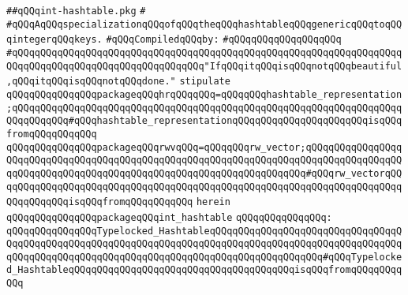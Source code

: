 \label{src/lib/src/int-hashtable.pkg}
\verb|##qQQqint-hashtable.pkg|\newline
\verb|#|\newline
\verb|#qQQqAqQQqspecializationqQQqofqQQqtheqQQqhashtableqQQqgenericqQQqtoqQQqintegerqQQqkeys.|\newline
\newline
\verb|#qQQqCompiledqQQqby:|\newline
\verb|#qQQqqQQqqQQqqQQqqQQq|\newline
\newline
\newline
\newline
\newline
\newline
\verb|#qQQqqQQqqQQqqQQqqQQqqQQqqQQqqQQqqQQqqQQqqQQqqQQqqQQqqQQqqQQqqQQqqQQqqQQqqQQqqQQqqQQqqQQqqQQqqQQqqQQqqQQq"IfqQQqitqQQqisqQQqnotqQQqbeautiful,qQQqitqQQqisqQQqnotqQQqdone."|\newline
\newline
\newline
\newline
\verb|stipulate|\newline
\verb|qQQqqQQqqQQqqQQqpackageqQQqhrqQQqqQQq=qQQqqQQqhashtable_representation;qQQqqQQqqQQqqQQqqQQqqQQqqQQqqQQqqQQqqQQqqQQqqQQqqQQqqQQqqQQqqQQqqQQqqQQqqQQqqQQq#qQQqhashtable_representationqQQqqQQqqQQqqQQqqQQqqQQqisqQQqfromqQQqqQQqqQQq|\newline
\verb|qQQqqQQqqQQqqQQqpackageqQQqrwvqQQq=qQQqqQQqrw_vector;qQQqqQQqqQQqqQQqqQQqqQQqqQQqqQQqqQQqqQQqqQQqqQQqqQQqqQQqqQQqqQQqqQQqqQQqqQQqqQQqqQQqqQQqqQQqqQQqqQQqqQQqqQQqqQQqqQQqqQQqqQQqqQQqqQQqqQQqqQQq#qQQqrw_vectorqQQqqQQqqQQqqQQqqQQqqQQqqQQqqQQqqQQqqQQqqQQqqQQqqQQqqQQqqQQqqQQqqQQqqQQqqQQqqQQqqQQqisqQQqfromqQQqqQQqqQQq|\newline
\verb|herein|\newline
\newline
\verb|qQQqqQQqqQQqqQQqpackageqQQqint_hashtable|\newline
\verb|qQQqqQQqqQQqqQQq:|\newline
\verb|qQQqqQQqqQQqqQQqTypelocked_HashtableqQQqqQQqqQQqqQQqqQQqqQQqqQQqqQQqqQQqqQQqqQQqqQQqqQQqqQQqqQQqqQQqqQQqqQQqqQQqqQQqqQQqqQQqqQQqqQQqqQQqqQQqqQQqqQQqqQQqqQQqqQQqqQQqqQQqqQQqqQQqqQQqqQQqqQQqqQQqqQQq#qQQqTypelocked_HashtableqQQqqQQqqQQqqQQqqQQqqQQqqQQqqQQqqQQqqQQqisqQQqfromqQQqqQQqqQQq|\newline
